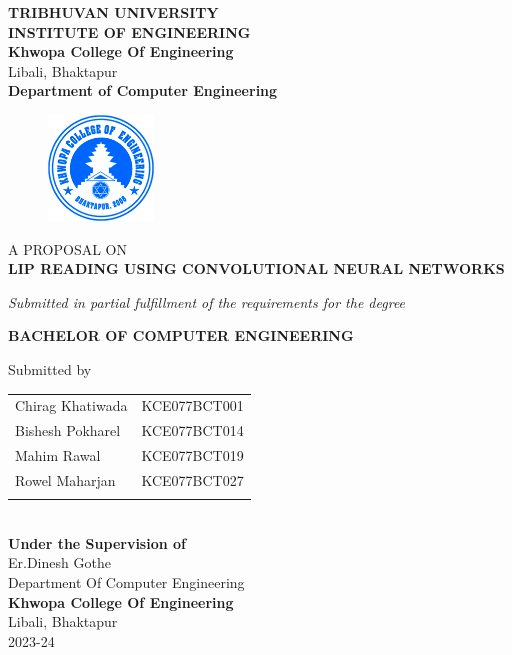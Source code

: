     \begin{center}
		\thispagestyle{empty}
		\Large\textbf{TRIBHUVAN UNIVERSITY}\\
		\Large\textbf{INSTITUTE OF ENGINEERING }\\
		\vspace{0.2in}
		\large{\textbf{Khwopa College Of Engineering}\\}
		\normalsize{Libali, Bhaktapur\\}
		\large\textbf{Department of Computer Engineering}
		\vspace{0.2in}
		\begin{figure}[h]
		    \centering
			    \includegraphics[width=0.25\textwidth]{images/Khwopalogo.jpg}
		\end{figure}
		
		\vspace{0.2in}
		\large{A PROPOSAL ON\\\textbf{LIP READING USING CONVOLUTIONAL NEURAL NETWORKS}\\}
		
		\vspace{0.2in}
		\large{\textit{Submitted in partial fulfillment of the requirements for the degree\\}}
		
		\vspace{0.2in}
		\large{\textbf{BACHELOR OF COMPUTER ENGINEERING}\\}
		
		\vspace{0.2in}
		\large{Submitted by}\\
		\begin{tabular}{p{3.5in}p{3in}}
			\hspace{0.3cm}Chirag Khatiwada & KCE077BCT001\\
			\hspace{0.3cm}Bishesh Pokharel & KCE077BCT014\\
			\hspace{0.3cm}Mahim Rawal & KCE077BCT019\\
			\hspace{0.3cm}Rowel Maharjan & KCE077BCT027\\
		 \vspace{0.2in}
		\end{tabular}
		\\
		\vspace{1cm}
		\large{\textbf{Under the Supervision of}\\}
			\normalsize{Er.Dinesh Gothe\\
				Department Of Computer Engineering\\
			}
			\vspace{2cm}
		\large{\textbf{Khwopa College Of Engineering}\\}
			\normalsize{Libali, Bhaktapur\\
			2023-24
		}
    \end{center}